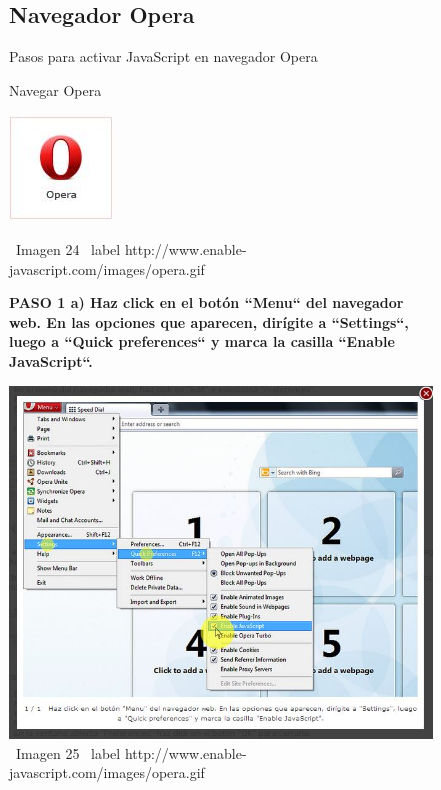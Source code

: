\documentclass[11pt]{article} %
\begin{document}
\begin{figure}
\subsection{Navegador Opera}
Pasos para activar JavaScript en navegador Opera
\begin{center}
\begin{center}
Navegar Opera

\end{center}
\begin{center}
\includegraphics[height=3 cm, width=3 cm] {imagenes/opera.jpg}
\end{center}

\ Imagen 24
\ label {http://www.enable-javascript.com/images/opera.gif}
\newline

\begin{center}
\bf PASO 1
a) Haz click en el botón ``Menu`` del navegador web. En las opciones que aparecen, dirígite a ``Settings``, luego a ``Quick preferences`` y marca la casilla ``Enable JavaScript``.
\end{center}
\includegraphics[height=8 cm, width=8 cm] {imagenes/opera 01.jpg}
\newline
\newline
\ Imagen 25
\ label {http://www.enable-javascript.com/images/opera.gif}

\end{center}
\end{figure}
\end{document}
